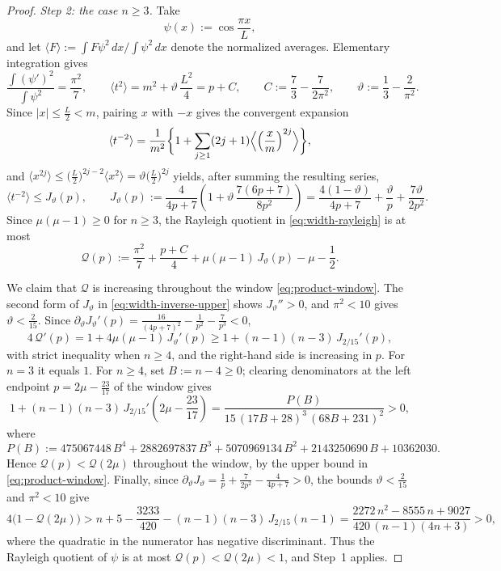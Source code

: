 \documentclass[11pt]{article}
\numberwithin{equation}{section}
\theoremstyle{definition}
\begin{document}
\begin{proof}
\emph{Step 2: the case $n\geq3$.} Take
\[
    \psi(x):=\cos\frac{\pi x}{L},
\]
and let $\langle F\rangle:=\int F\psi^2\,dx\big/\!\int\psi^2\,dx$ denote the normalized averages. Elementary integration gives
\begin{equation}\label{eq:width-cos-moments}
    \frac{\int(\psi')^2}{\int\psi^2}=\frac{\pi^2}{7},
    \qquad
    \langle t^2\rangle=m^2+\vartheta\,\frac{L^2}4=p+C,
    \qquad
    C:=\frac73-\frac7{2\pi^2},
    \qquad
    \vartheta:=\frac13-\frac2{\pi^2}.
\end{equation}
Since $|x|\leq\frac L2<m$, pairing $x$ with $-x$ gives the convergent expansion
\[
    \langle t^{-2}\rangle
    =\frac1{m^2}\biggl\{1+\sum_{j\geq1}(2j+1)\Bigl\langle\Bigl(\frac xm\Bigr)^{2j}\Bigr\rangle\biggr\},
\]
and $\langle x^{2j}\rangle\leq\bigl(\tfrac L2\bigr)^{2j-2}\langle x^2\rangle=\vartheta\bigl(\tfrac L2\bigr)^{2j}$ yields, after summing the resulting series,
\begin{equation}\label{eq:width-inverse-upper}
    \langle t^{-2}\rangle\leq J_\vartheta(p),
    \qquad
    J_\vartheta(p):=\frac4{4p+7}\left(1+\vartheta\,\frac{7(6p+7)}{8p^2}\right)
    =\frac{4(1-\vartheta)}{4p+7}+\frac\vartheta p+\frac{7\vartheta}{2p^2}.
\end{equation}
Since $\mu(\mu-1)\geq0$ for $n\geq3$, the Rayleigh quotient in \eqref{eq:width-rayleigh} is at most
\begin{equation}\label{eq:width-Q}
    \mathcal Q(p):=\frac{\pi^2}7+\frac{p+C}4+\mu(\mu-1)\,J_\vartheta(p)-\mu-\frac12 .
\end{equation}

We claim that $\mathcal Q$ is increasing throughout the window \eqref{eq:product-window}. The second form of $J_\vartheta$ in \eqref{eq:width-inverse-upper} shows $J_\vartheta''>0$, and $\pi^2<10$ gives $\vartheta<\frac2{15}$. Since $\partial_\vartheta J_\vartheta'(p)=\frac{16}{(4p+7)^2}-\frac1{p^2}-\frac7{p^3}<0$,
\[
    4\,\mathcal Q'(p)
    =1+4\mu(\mu-1)\,J_\vartheta'(p)
    \geq 1+(n-1)(n-3)\,J_{2/15}'(p),
\]
with strict inequality when $n\geq 4$, and the right-hand side is increasing in $p$. For $n=3$ it equals $1$. For $n\geq4$, set $B:=n-4\geq0$; clearing denominators at the left endpoint $p=2\mu-\frac{23}{17}$ of the window gives
\[
    1+(n-1)(n-3)\,J_{2/15}'\!\left(2\mu-\frac{23}{17}\right)
    =\frac{P(B)}{15\,(17B+28)^3\,(68B+231)^2}>0,
\]
where
\[
    P(B):=475067448\,B^4+2882697837\,B^3+5070969134\,B^2+2143250690\,B+10362030 .
\]
Hence $\mathcal Q(p)<\mathcal Q(2\mu)$ throughout the window, by the upper bound in \eqref{eq:product-window}. Finally, since $\partial_\vartheta J_\vartheta=\frac1p+\frac7{2p^2}-\frac4{4p+7}>0$, the bounds $\vartheta<\frac2{15}$ and $\pi^2<10$ give
\[
    4\bigl(1-\mathcal Q(2\mu)\bigr)
    >n+5-\frac{3233}{420}-(n-1)(n-3)\,J_{2/15}(n-1)
    =\frac{2272\,n^2-8555\,n+9027}{420\,(n-1)(4n+3)}>0,
\]
where the quadratic in the numerator has negative discriminant. Thus the Rayleigh quotient of $\psi$ is at most $\mathcal Q(p)<\mathcal Q(2\mu)<1$, and Step~1 applies.


\end{proof}
\end{document}
